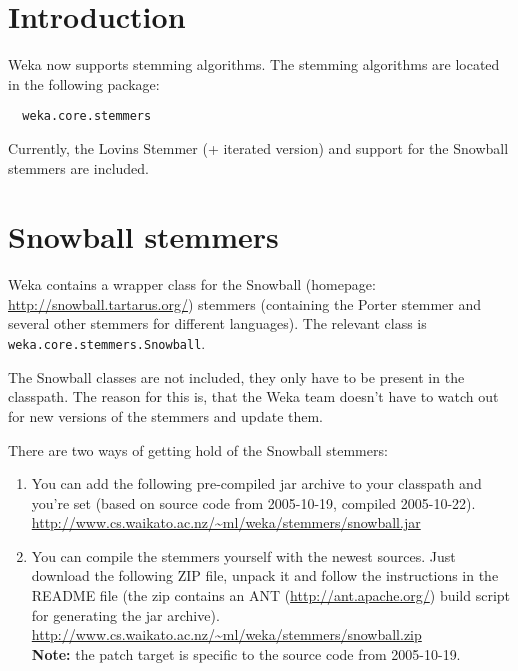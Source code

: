 %
%
%
%


\section{Introduction}
Weka now supports stemming algorithms. The stemming algorithms are located in the following package:

\begin{verbatim}
  weka.core.stemmers
\end{verbatim}

\noindent Currently, the Lovins Stemmer (+ iterated version) and support for the Snowball stemmers are included.

\section{Snowball stemmers}
Weka contains a wrapper class for the Snowball (homepage: \url{http://snowball.tartarus.org/}{}) stemmers (containing the Porter stemmer and several other stemmers for different languages). The relevant class is \texttt{weka.core.stemmers.Snowball}.

The Snowball classes are not included, they only have to be present in the classpath. The reason for this is, that the Weka team doesn't have to watch out for new versions of the stemmers and update them.

There are two ways of getting hold of the Snowball stemmers:

\begin{enumerate}
	\item You can add the following pre-compiled jar archive to your classpath and you're set (based on source code from 2005-10-19, compiled 2005-10-22). \\
	\url{http://www.cs.waikato.ac.nz/~ml/weka/stemmers/snowball.jar}{}
	\item You can compile the stemmers yourself with the newest sources. Just download the following ZIP file, unpack it and follow the instructions in the README file (the zip contains an ANT (\url{http://ant.apache.org/}{}) build script for generating the jar archive). \\
	\url{http://www.cs.waikato.ac.nz/~ml/weka/stemmers/snowball.zip}{} \\
      \textbf{Note:} the patch target is specific to the source code from 2005-10-19.
\end{enumerate}

